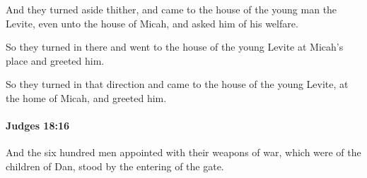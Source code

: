 			\begin{versebox}
					\item[BHS] 
					\item[ASV] And they turned aside thither, and came to the house of the young man the Levite, even unto the house of Micah, and asked him of his welfare.
					\item[NIV] So they turned in there and went to the house of the young Levite at Micah’s place and greeted him.
					\item[NRSV] So they turned in that direction and came to the house of the young Levite, at the home of Micah, and greeted him.
			\end{versebox}

		\paragraph{Judges 18:16} %
			\label{JUDGES-18-16}

			And the six hundred men appointed with their weapons of war, which were of the children of Dan, stood by the entering of the gate.

